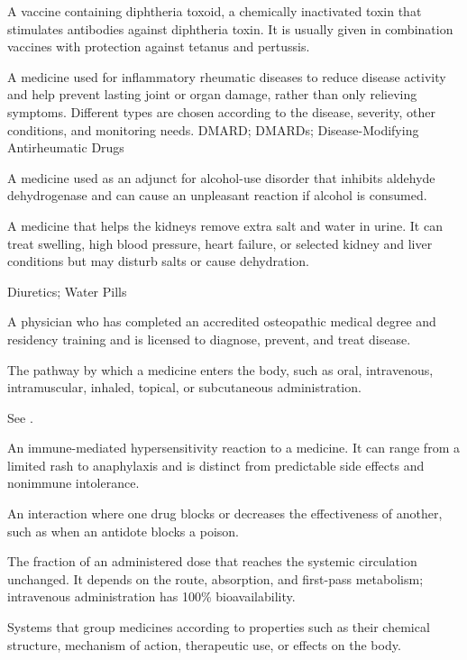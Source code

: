  A vaccine containing diphtheria toxoid, a chemically inactivated toxin that stimulates antibodies against diphtheria toxin. It is usually given in combination vaccines with protection against tetanus and pertussis.

 A medicine used for inflammatory rheumatic diseases to reduce disease activity and help prevent lasting joint or organ damage, rather than only relieving symptoms. Different types are chosen according to the disease, severity, other conditions, and monitoring needs.
\synonyms
DMARD; DMARDs; Disease-Modifying Antirheumatic Drugs

 A medicine used as an adjunct for alcohol-use disorder that inhibits aldehyde dehydrogenase and can cause an unpleasant reaction if alcohol is consumed.

 A medicine that helps the kidneys remove extra salt and water in urine. It can treat swelling, high blood pressure, heart failure, or selected kidney and liver conditions but may disturb salts or cause dehydration.

\synonyms
Diuretics; Water Pills

 A physician who has completed an accredited osteopathic medical degree and residency training and is licensed to diagnose, prevent, and treat disease.


 The pathway by which a medicine enters the body, such as oral, intravenous, intramuscular, inhaled, topical, or subcutaneous administration.

 See .

 An immune-mediated hypersensitivity reaction to a medicine. It can range from a limited rash to anaphylaxis and is distinct from predictable side effects and nonimmune intolerance.

 An interaction where one drug blocks or decreases the effectiveness of another, such as
when an antidote blocks a poison.

 The fraction of an administered dose that reaches the systemic circulation unchanged. It depends on the route, absorption, and first-pass metabolism; intravenous administration has 100\% bioavailability.

 Systems that group medicines according to properties such as their chemical structure, mechanism of action, therapeutic use, or effects on the body.

